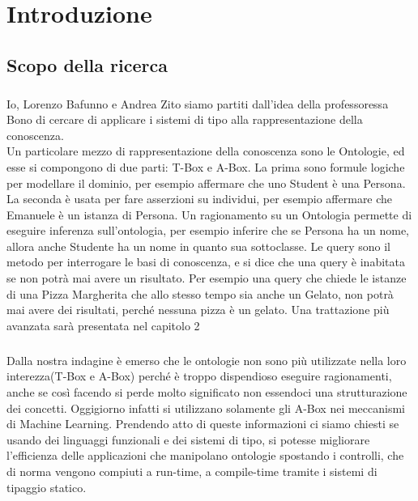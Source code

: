 \chapter{Introduzione}

\section{Scopo della ricerca}
\paragraph{} Io, Lorenzo Bafunno e Andrea Zito siamo partiti dall'idea della professoressa Bono di cercare di applicare i sistemi di tipo alla rappresentazione della conoscenza. \\
Un particolare mezzo di rappresentazione della conoscenza sono le Ontologie, ed esse si compongono di due parti: T-Box e A-Box. La prima sono formule logiche per modellare il dominio, per esempio affermare che uno Student è una Persona. La seconda è usata per fare asserzioni su individui, per esempio affermare che Emanuele è un istanza di Persona. Un ragionamento su un Ontologia permette di eseguire inferenza sull'ontologia, per esempio inferire che se Persona ha un nome, allora anche Studente ha un nome in quanto sua sottoclasse. Le query sono il metodo per interrogare le basi di conoscenza, e si dice che una query è inabitata se non potrà mai avere un risultato. Per esempio una query che chiede le istanze di una Pizza Margherita che allo stesso tempo sia anche un Gelato, non potrà mai avere dei risultati, perché nessuna pizza è un gelato.  Una trattazione più avanzata sarà presentata nel capitolo 2

\paragraph{} Dalla nostra indagine è emerso che le ontologie non sono più utilizzate nella loro interezza(T-Box e A-Box) perché è troppo dispendioso eseguire ragionamenti, anche se così facendo si perde molto significato non essendoci una strutturazione dei concetti. Oggigiorno infatti si utilizzano solamente gli A-Box nei meccanismi di Machine Learning. Prendendo atto di queste informazioni ci siamo chiesti se usando dei linguaggi funzionali e dei sistemi di tipo, si potesse migliorare l'efficienza delle applicazioni che manipolano ontologie spostando i controlli, che di norma vengono compiuti a run-time, a compile-time tramite i sistemi di tipaggio statico.     

